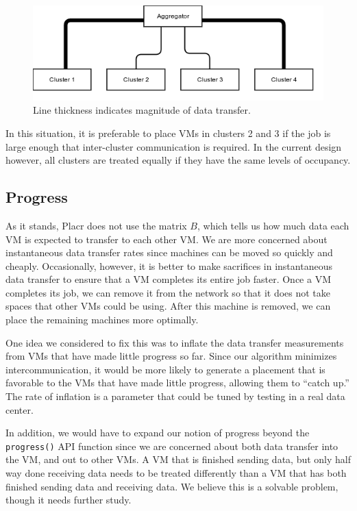 \documentclass[11pt]{article}
\begin{document}
\begin{figure}
  \centering
\includegraphics[scale=0.7]{cluster_congestion.png}

 \caption{Line thickness indicates magnitude of data transfer.}

 \label{fig:cluster_congestion}
 
\end{figure}
 
 In this situation, it is preferable to place VMs in clusters 2 and 3 if the job is large enough that inter-cluster communication is required.  In the current design however, all clusters are treated equally if they have the same levels of occupancy.
 
\subsection{Progress}

As it stands, Placr does not use the matrix $B$, which tells us how much data each VM is expected to transfer to each other VM. We are more concerned about instantaneous data transfer rates since machines can be moved so quickly and cheaply.  Occasionally, however, it is better to make sacrifices in instantaneous data transfer to ensure that a VM completes its entire job faster.  Once a VM completes its job, we can remove it from the network so that it does not take spaces that other VMs could be using.  After this machine is removed, we can place the remaining machines more optimally.

One idea we considered to fix this was to inflate the data transfer measurements from VMs that have made little progress so far.  Since our algorithm minimizes intercommunication, it would be more likely to generate a placement that is favorable to the VMs that have made little progress, allowing them to ``catch up.''  The rate of inflation is a parameter that could be tuned by testing in a real data center.

In addition, we would have to expand our notion of progress beyond the \texttt{progress()} API function since we are concerned about both data transfer into the VM, and out to other VMs.  A VM that is finished sending data, but only half way done receiving data needs to be treated differently than a VM that has both finished sending data and receiving data.  We believe this is a solvable problem, though it needs further study.
\end{document}
